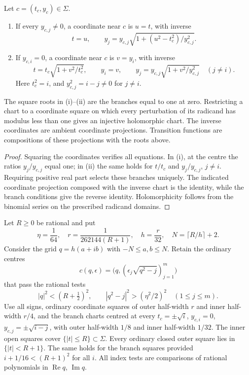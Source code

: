 \begin{lemma}\label{lem:vtr-atlas}
Let $c=(t_c,y_c)\in\Sigma$.
\begin{enumerate}[label=(\roman*)]
\item If every $y_{c,j}\ne0$, a coordinate near $c$ is $u=t$, with inverse
\[
 t=u,\qquad y_j=y_{c,j}\sqrt{1+(u^2-t_c^2)/y_{c,j}^2}.
\]
\item If $y_{c,i}=0$, a coordinate near $c$ is $v=y_i$, with inverse
\[
 t=t_c\sqrt{1+v^2/t_c^2},\qquad y_i=v,\qquad
 y_j=y_{c,j}\sqrt{1+v^2/y_{c,j}^2}\quad(j\ne i).
\]
Here $t_c^2=i$, and $y_{c,j}^2=i-j\ne0$ for $j\ne i$.
\end{enumerate}
The square roots in (i)--(ii) are the branches equal to one at zero. Restricting a chart to a coordinate square on
which every perturbation of its radicand has modulus less than one gives an injective holomorphic chart.
The inverse coordinates are ambient coordinate projections. Transition functions are compositions of
these projections with the roots above.
\end{lemma}

\begin{proof}
Squaring the coordinates verifies all equations. In (i), at the centre the ratios $y_j/y_{c,j}$ equal one; in (ii)
the same holds for $t/t_c$ and $y_j/y_{c,j}$, $j\ne i$. Requiring positive real part selects these branches uniquely.
The indicated coordinate projection composed with the inverse chart is the identity, while the branch conditions give
the reverse identity. Holomorphicity follows from the binomial series on the prescribed radicand domains.
\end{proof}

\begin{lemma}\label{lem:vtr-cells}
Let $R\ge0$ be rational and put
\[
 \eta=\frac1{64},\quad r=\frac1{262144(R+1)},\quad h=\frac r{32},\quad
 N=\lceil R/h\rceil+2.
\]
Consider the grid $q=h(a+ib)$ with $-N\le a,b\le N$. Retain the ordinary centres
\[
 c(q,\epsilon)=\bigl(q,(\epsilon_j\sqrt{q^2-j})_{j=1}^m\bigr)
\]
that pass the rational tests
\[
 |q|^2<(R+\tfrac12)^2,\qquad |q^2-j|^2>(\eta^2/2)^2\quad(1\le j\le m).
\]
Use all signs, ordinary coordinate squares of outer half-width $r$ and inner half-width $r/4$, and the branch charts
centred at every $t_c=\pm\sqrt i$, $y_{c,i}=0$, $y_{c,j}=\pm\sqrt{i-j}$, with outer half-width $1/8$ and inner half-width
$1/32$. The inner open squares cover $\{|t|\le R\}\subset\Sigma$.
Every ordinary closed outer square lies in $\{|t|<R+1\}$. The same holds for the branch squares provided
$i+1/16<(R+1)^2$ for all $i$.
All index tests are comparisons of rational polynomials in $\operatorname{Re}q$, $\operatorname{Im}q$.
\end{lemma}

